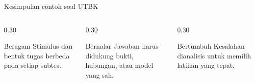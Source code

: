 \begin{frame}{Kesimpulan contoh soal UTBK}
  \begin{columns}[T,onlytextwidth]
    \begin{column}{0.30\textwidth}
      \begin{block}{Beragam}
        Stimulus dan bentuk tugas berbeda pada setiap subtes.
      \end{block}
    \end{column}
    \begin{column}{0.30\textwidth}
      \begin{block}{Bernalar}
        Jawaban harus didukung bukti, hubungan, atau model yang sah.
      \end{block}
    \end{column}
    \begin{column}{0.30\textwidth}
      \begin{block}{Bertumbuh}
        Kesalahan dianalisis untuk memilih latihan yang tepat.
      \end{block}
    \end{column}
  \end{columns}
  \vspace{0.26cm}
\end{frame}

